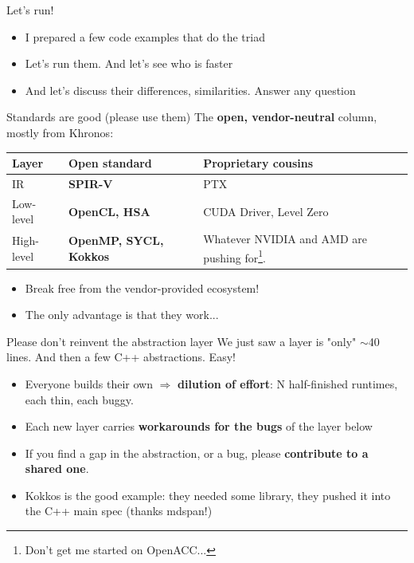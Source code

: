 \begin{frame}{Let's run!}

\begin{itemize}
    \item I prepared a few code examples that do the triad
    \item Let's run them. And let's see who is faster
    \item And let's discuss their differences, similarities. Answer any question
\end{itemize}

\end{frame}


\begin{frame}{Standards are good (please use them)}
The \textbf{open, vendor-neutral} column, mostly from Khronos:
\begin{center}
\begin{tabular}{@{}lll@{}}
\toprule
Layer & Open standard & Proprietary cousins \\
\midrule
IR         & \textbf{SPIR-V}          & PTX \\
Low-level  & \textbf{OpenCL, HSA}     & CUDA Driver, Level Zero \\
High-level & \textbf{OpenMP, SYCL, Kokkos}            & Whatever NVIDIA and AMD are pushing for\footnote{Don't get me started on OpenACC...}.  \\
\bottomrule
\end{tabular}
\end{center}
\begin{itemize}
    \item Break free from the vendor-provided ecosystem!
    \item The only advantage is that they work...
\end{itemize}
\end{frame}

\begin{frame}{Please don't reinvent the abstraction layer}
We just saw a layer is "only" $\sim$40 lines. And then a few C++ abstractions. Easy!
\begin{itemize}
    \item Everyone builds their own $\Rightarrow$ \textbf{dilution of effort}: N
          half-finished runtimes, each thin, each buggy.
    \item Each new layer carries \textbf{workarounds for the bugs} of the layer below
\end{itemize}

\begin{itemize}
    \item If you find a gap in the abstraction, or a bug, please \textbf{contribute to a shared one}.
    \item Kokkos is the good example: they needed some library, they pushed it into the C++ main spec (thanks mdspan!)
\end{itemize}

\end{frame}


